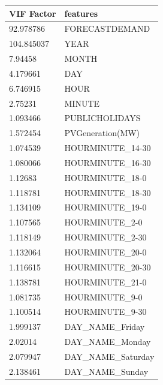\documentclass[mstat,12pt]{unswthesis}
\begin{document}
\begin{table}[H]
\centering
\begin{tabular}{ll} 
\hline\hline
\textbf{VIF Factor} & \textbf{features}                 \\ 
\hline\hline
92.978786           & FORECASTDEMAND                    \\
104.845037          & YEAR                              \\
7.94458             & MONTH                             \\
4.179661            & DAY                               \\
6.746915            & HOUR                              \\
2.75231             & MINUTE                            \\
1.093466            & PUBLICHOLIDAYS                    \\
1.572454            & PVGeneration(MW)                  \\
1.074539            & HOURMINUTE\_14-30                 \\
1.080066            & HOURMINUTE\_16-30                 \\
1.12683             & HOURMINUTE\_18-0                  \\
1.118781            & HOURMINUTE\_18-30                 \\
1.134109            & HOURMINUTE\_19-0                  \\
1.107565            & HOURMINUTE\_2-0                   \\
1.118149            & HOURMINUTE\_2-30                  \\
1.132064            & HOURMINUTE\_20-0                  \\
1.116615            & HOURMINUTE\_20-30                 \\
1.138781            & HOURMINUTE\_21-0                  \\
1.081735            & HOURMINUTE\_9-0                   \\
1.100514            & HOURMINUTE\_9-30                  \\
1.999137            & DAY\_NAME\_Friday                 \\
2.02014             & DAY\_NAME\_Monday                 \\
2.079947            & DAY\_NAME\_Saturday               \\
2.138461            & DAY\_NAME\_Sunday                 \\

\end{tabular}
\end{table}
\end{document}
